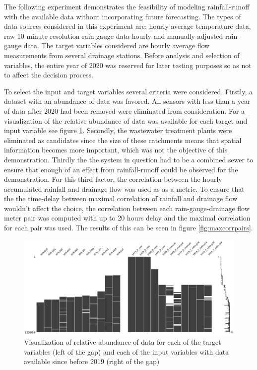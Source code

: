The following experiment demonstrates the feasibility of modeling rainfall-runoff with the available data without incorporating future forecasting. The types of data sources considered in this experiment are: hourly average temperature data, raw 10 minute resolution rain-gauge data hourly and manually adjusted rain-gauge data. The target variables considered are hourly average flow measurements from several drainage stations. Before analysis and selection of variables, the entire year of 2020 was reserved for later testing purposes so as not to affect the decision process. 

To select the input and target variables several criteria were considered. Firstly, a dataset with an abundance of data was favored. All sensors with less than a year of data after 2020 had been removed were eliminated from consideration. For a visualization of the relative abundance of data was available for each target and input variable see figure \ref{fig:missingdata}.  Secondly, the wastewater treatment plants were eliminated as candidates since the size of these catchments means that spatial information becomes more important, which was not the objective of this demonstration. Thirdly the the system in question had to be a combined sewer to ensure that enough of an effect from rainfall-runoff could be observed for the demonstration. For this third factor, the correlation between the hourly accumulated rainfall and drainage flow was used as as a metric. To ensure that the the time-delay between maximal correlation of rainfall and drainage flow wouldn't affect the choice, the correlation between each rain-gauge-drainage flow meter pair was computed with up to 20 hours delay and the maximal correlation for each pair was used. The results of this can be seen in figure \ref{fig:maxcorrpairs}. 

\begin{figure}
\centering\includegraphics[width=\textwidth]{Pictures/Plots/missingdata.png}
\caption{Visualization of relative abundance of data for each of the target variables (left of the gap) and each of the input variables with data available since before 2019 (right of the gap)}
\label{fig:missingdata}
\end{figure}

